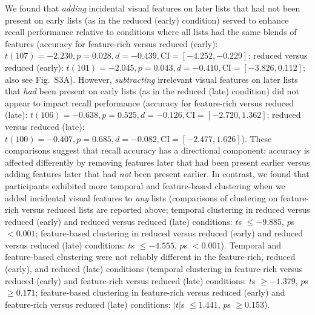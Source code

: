 \documentclass[11pt]{article}
\newcommand{\accuracyByList}{S3}
\begin{document}
We found that \textit{adding} incidental visual features on later lists that
had not been present on early lists (as in the reduced (early) condition)
served to enhance recall performance relative to conditions where all lists had
the same blends of features (accuracy for feature-rich versus reduced (early):
$t(107) = -2.230, p = 0.028, d = -0.439, \mathrm{CI} = [-4.252, -0.229]$;
reduced versus reduced (early): $t(101) = -2.045, p = 0.043, d = -0.410,
\mathrm{CI} = [-3.826, 0.112]$; also see Fig.~\accuracyByList A). However,
\textit{subtracting} irrelevant visual features on later lists that
\textit{had} been present on early lists (as in the reduced (late) condition)
did not appear to impact recall performance (accuracy for feature-rich versus
reduced (late): $t(106) = -0.638, p = 0.525, d = -0.126, \mathrm{CI} = [-2.720,
1.362]$; reduced versus reduced (late): $t(100) = -0.407, p = 0.685, d =
-0.082, \mathrm{CI} = [-2.477, 1.626]$). These comparisons suggest that recall
accuracy has a directional component: accuracy is affected differently by
removing features later that had been present earlier versus adding features
later that had \textit{not} been present earlier. In contrast, we found that
participants exhibited more temporal and feature-based clustering when we added
incidental visual features to \textit{any} lists (comparisons of clustering on
feature-rich versus reduced lists are reported above; temporal clustering in
reduced versus reduced (early) and reduced versus reduced (late) conditions:
$t$s $\leq -9.885$, $p$s $< 0.001$; feature-based clustering in reduced versus
reduced (early) and reduced versus reduced (late) conditions: $t$s $\leq
-4.555$, $p$s $< 0.001$). Temporal and feature-based clustering were not
reliably different in the feature-rich, reduced (early), and reduced (late)
conditions (temporal clustering in feature-rich versus reduced (early) and
feature-rich versus reduced (late) conditions: $t$s $\geq -1.379$, $p$s $\geq
0.171$; feature-based clustering in feature-rich versus reduced (early) and
feature-rich versus reduced (late) conditions: $|t|$s $\leq 1.441$, $p$s $\geq
0.153$).
\end{document}
